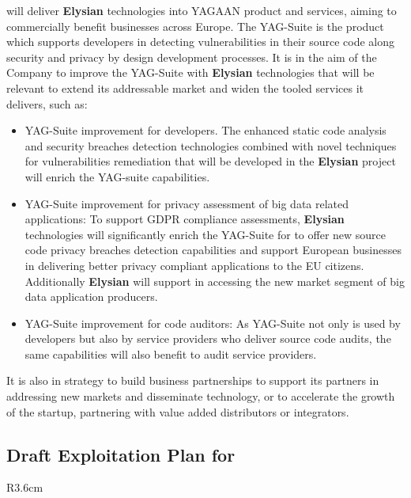 \documentclass[a4paper,11pt]{article}
\newcommand{\project}[1]{\textbf{#1}\xspace}
\newcommand{\SECURITY}{\project{Elysian}}
\newcommand{\TheProject}{\SECURITY}
\begin{document}
 \YAGshort{} will deliver \TheProject technologies into YAGAAN product and services, aiming to commercially benefit businesses across Europe. The YAG-Suite is the \YAGshort{} product which supports developers in detecting vulnerabilities in their source code along security and privacy by design development processes. It is in the aim of the Company to improve the YAG-Suite with \TheProject technologies that will be relevant to extend its addressable market and widen the tooled services it delivers, such as:
\begin{itemize}
    \item YAG-Suite improvement for developers. The enhanced static code analysis and security breaches detection technologies combined with novel techniques for vulnerabilities remediation that will be developed in the \TheProject project will enrich the YAG-suite capabilities.
    \item YAG-Suite improvement for privacy assessment of big data related applications: To support GDPR compliance assessments, \TheProject technologies will significantly enrich the YAG-Suite for \YAGshort{} to offer new source code privacy breaches detection capabilities and support European businesses in delivering better privacy compliant applications to the EU citizens. Additionally \TheProject will support \YAGshort{} in accessing the new market segment of big data application producers.
    \item YAG-Suite improvement for code auditors: As YAG-Suite not only is used by developers but also by service providers who deliver source code audits, the same capabilities will also benefit to audit service providers.
\end{itemize}
It is also in \YAGshort{} strategy to build business partnerships to support its partners in addressing new markets and disseminate \YAGshort{} technology, or to accelerate the growth of the startup, partnering with value added distributors or integrators.

\horizontalline

\pagebreak

\subsection*{Draft Exploitation Plan for \COGNIshort{}}
\vspace{-6pt}

\begin{wrapfigure}{R}{3.6cm}
\vspace{-1.3cm}
\hfill {}
\vspace{-0.8cm}
\end{wrapfigure}
\end{document}
